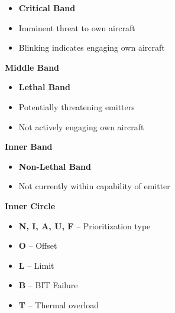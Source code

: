 \documentclass[fontSpartan]{TechCheck}
\begin{document}
\begin{longtableitemize}
{\begin{subitemize}
			\begin{itemize}
				\item \textbf{Critical Band}
				\item Imminent threat to own aircraft
				\item Blinking indicates engaging own aircraft
			\end{itemize}
			\item \textbf{Middle Band}
			\begin{itemize}
				\item \textbf{Lethal Band}
				\item Potentially threatening emitters
				\item Not actively engaging own aircraft
			\end{itemize}
			\item \textbf{Inner Band}
			\begin{itemize}
				\item \textbf{Non-Lethal Band}
				\item Not currently within capability of emitter
			\end{itemize}
			\item \textbf{Inner Circle}
			\begin{itemize}
				\item \textbf{N, I, A, U, F} -- Prioritization type
				\item \textbf{O} -- Offset
				\item \textbf{L} -- Limit
				\item \textbf{B} -- BIT Failure
				\item \textbf{T} -- Thermal overload
			\end{itemize}
		\end{subitemize}}
	\end{longtableitemize}

	\clearpage
\end{document}
